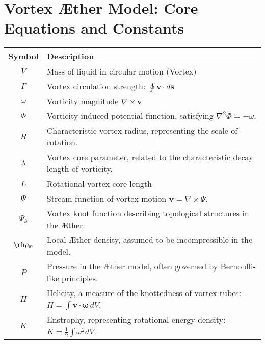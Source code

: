 


\section{Vortex Æther Model: Core Equations and Constants}


    \maketitle
    \begin{table}[htbp]
        \centering
        \renewcommand{\arraystretch}{1.0}
        \begin{tabular}{c l}
            \toprule
            Symbol & Description \\
            \midrule
            \( V \) & Mass of liquid in circular motion (Vortex) \\
            \( \Gamma \) & Vortex circulation strength: \( \oint \mathbf{v} \cdot d\mathbf{s} \) \\
            \( \omega \) & Vorticity magnitude \(\nabla \times \mathbf{v} \) \\
            \( \Phi \) & Vorticity-induced potential function, satisfying \( \nabla^2 \Phi = -\omega \). \\
            \( R \) & Characteristic vortex radius, representing the scale of rotation. \\
            \( \lambda \) & Vortex core parameter, related to the characteristic decay length of vorticity. \\
            \( L \) & Rotational vortex core length \\
            \( \Psi \) & Stream function of vortex motion \( \mathbf{v} = \nabla \times \Psi \). \\
            \( \Psi_k \) & Vortex knot function describing topological structures in the Æther. \\
            \( \rh\rho_\text{\ae} \) & Local Æther density, assumed to be incompressible in the model. \\
            \( P \) & Pressure in the Æther model, often governed by Bernoulli-like principles. \\
            \( H \) & Helicity, a measure of the knottedness of vortex tubes: \( H = \int \mathbf{v} \cdot \mathbf{\omega} \, dV \). \\
            \( K \) & Enstrophy, representing rotational energy density: \( K = \frac{1}{2} \int \omega^2 dV \). \\

\end{tabular}
\end{table}
